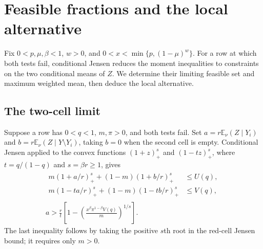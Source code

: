 \section{Feasible fractions and the local alternative}
\label{sec:feasible-fractions}

Fix $0<p,\mu,\beta<1$, $w>0$, and $0<x<\min\{p,(1-\mu)^w\}$.
For a row at which both tests fail, conditional Jensen reduces the
moment inequalities to constraints on the two conditional means of $Z$.
We determine their limiting feasible set and maximum weighted mean,
then deduce the local alternative.

\subsection{The two-cell limit}

Suppose a row has $0<q<1$, $m,\pi>0$, and both tests fail.
Set $a=r\mathbb E_\nu(Z\mid Y_i)$ and
$b=r\mathbb E_\nu(Z\mid Y\setminus Y_i)$, taking $b=0$ when the second
cell is empty. Conditional Jensen applied to the convex functions
$(1+z)_+^s$ and $(1-tz)_+^s$, where $t=q/(1-q)$ and $s=\beta r\ge1$,
gives
\begin{equation}\label{eq:finite-cells}
 \begin{gathered}
 \begin{aligned}
 m(1+a/r)_+^s+(1-m)(1+b/r)_+^s&\le U(q),\\
 m(1-ta/r)_+^s+(1-m)(1-tb/r)_+^s&\le V(q),
 \end{aligned}\\[1ex]
 a>\frac r t\left[1-
       \left(\frac{x^\beta\pi^{1-\beta}V(q)}m\right)^{1/s}\right].
 \end{gathered}
\end{equation}
The last inequality follows by taking the positive $s$th root in
the red-cell Jensen bound; it requires only $m>0$.

